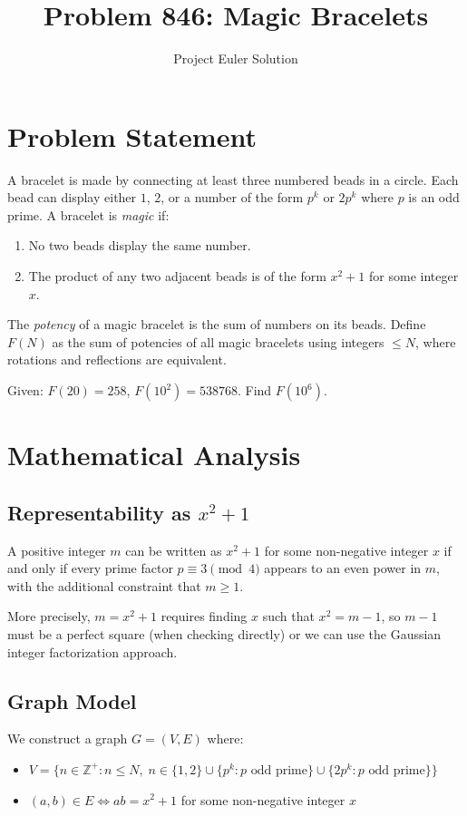 \documentclass[12pt]{article}
\title{Problem 846: Magic Bracelets}
\author{Project Euler Solution}
\date{}
\begin{document}
\maketitle

\section{Problem Statement}

A bracelet is made by connecting at least three numbered beads in a circle. Each bead can display either $1$, $2$, or a number of the form $p^k$ or $2p^k$ where $p$ is an odd prime. A bracelet is \emph{magic} if:
\begin{enumerate}
    \item No two beads display the same number.
    \item The product of any two adjacent beads is of the form $x^2 + 1$ for some integer $x$.
\end{enumerate}

The \emph{potency} of a magic bracelet is the sum of numbers on its beads. Define $F(N)$ as the sum of potencies of all magic bracelets using integers $\leq N$, where rotations and reflections are equivalent.

Given: $F(20) = 258$, $F(10^2) = 538768$. Find $F(10^6)$.

\section{Mathematical Analysis}

\subsection{Representability as $x^2 + 1$}

A positive integer $m$ can be written as $x^2 + 1$ for some non-negative integer $x$ if and only if every prime factor $p \equiv 3 \pmod{4}$ appears to an even power in $m$, with the additional constraint that $m \geq 1$.

More precisely, $m = x^2 + 1$ requires finding $x$ such that $x^2 = m - 1$, so $m - 1$ must be a perfect square (when checking directly) or we can use the Gaussian integer factorization approach.

\subsection{Graph Model}

We construct a graph $G = (V, E)$ where:
\begin{itemize}
    \item $V = \{n \in \mathbb{Z}^+ : n \leq N, \; n \in \{1, 2\} \cup \{p^k : p \text{ odd prime}\} \cup \{2p^k : p \text{ odd prime}\}\}$
    \item $(a,b) \in E \iff ab = x^2 + 1$ for some non-negative integer $x$
\end{itemize}
\end{document}
